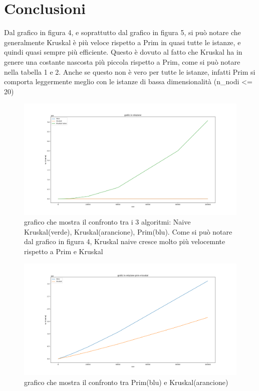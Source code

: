 \section{Conclusioni}
\label{conlusioni}

Dal grafico in figura 4, e soprattutto dal grafico in figura 5, si può notare che generalmente Kruskal è più veloce rispetto a Prim in quasi tutte le istanze, e quindi quasi sempre più efficiente. Questo è dovuto al fatto che Kruskal ha in genere una costante nascosta più piccola rispetto a Prim, come si può notare nella tabella 1 e 2.
Anche se questo non è vero per tutte le istanze, infatti Prim si comporta leggermente meglio con le istanze di bassa dimensionalità (n\_nodi <= 20)

\begin{figure}[htbp]
    \centering
    \centerline{\includegraphics[scale = 0.38]{Fig/graficiRelazione.png}}
    \caption{grafico che mostra il confronto tra i 3 algoritmi: Naive Kruskal(verde), Kruskal(arancione), Prim(blu). Come si può notare dal grafico in figura 4, Kruskal naive cresce molto più velocemnte rispetto a Prim e Kruskal}
    \label{Kruskal naive}
\end{figure}

\newpage
\begin{figure}[htbp]
    \centering
    \centerline{\includegraphics[scale = 0.38]{Fig/primkruskalrelazione.png}}
    \caption{grafico che mostra il confronto tra Prim(blu) e Kruskal(arancione)}
    \label{Kruskal naive}
\end{figure}

